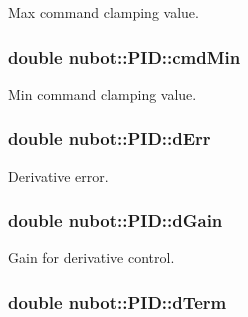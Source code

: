 Max command clamping value. 

\hypertarget{group__gazebo__common_ga887cadc64650fbd326b05c081141603f}{
\subsubsection[{cmd\-Min}]{\setlength{\rightskip}{0pt plus 5cm}double nubot\-::\-P\-I\-D\-::cmd\-Min\hspace{0.3cm}{\ttfamily [private]}}}\label{group__gazebo__common_ga887cadc64650fbd326b05c081141603f}


Min command clamping value. 

\hypertarget{group__gazebo__common_gaa8ebb6b2cec73c281d83ac6882739320}{
\subsubsection[{d\-Err}]{\setlength{\rightskip}{0pt plus 5cm}double nubot\-::\-P\-I\-D\-::d\-Err\hspace{0.3cm}{\ttfamily [private]}}}\label{group__gazebo__common_gaa8ebb6b2cec73c281d83ac6882739320}


Derivative error. 

\hypertarget{group__gazebo__common_ga4e2f4ef996f5fd9628686b5111e3d0d3}{
\subsubsection[{d\-Gain}]{\setlength{\rightskip}{0pt plus 5cm}double nubot\-::\-P\-I\-D\-::d\-Gain\hspace{0.3cm}{\ttfamily [private]}}}\label{group__gazebo__common_ga4e2f4ef996f5fd9628686b5111e3d0d3}


Gain for derivative control. 

\hypertarget{group__gazebo__common_ga5b1af456567f8c17b81d4be70dbb1bb1}{
\subsubsection[{d\-Term}]{\setlength{\rightskip}{0pt plus 5cm}double nubot\-::\-P\-I\-D\-::d\-Term\hspace{0.3cm}{\ttfamily [private]}}}\label{group__gazebo__common_ga5b1af456567f8c17b81d4be70dbb1bb1}


